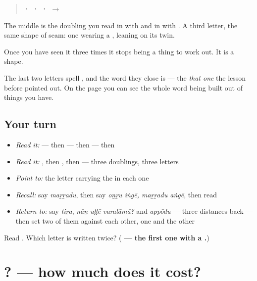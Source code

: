 \begin{quote}
\textbf{ ·  ·  ·  $\to$ }
\end{quote}

The middle is the doubling you read in \textbf{} with  and in \textbf{} with . A third letter, the same shape of seam: one wearing a \textbf{}, leaning on its twin.

Once you have seen it three times it stops being a thing to work out. It is a shape.

The last two letters spell \textbf{}, and the word they close is \textbf{} — the \emph{that one} the lesson before pointed out. On the page you can see the whole word being built out of things you have.

\subsection*{Your turn}
\begin{itemize}
\raggedright
  \item \emph{Read it:} \textbf{} — then \textbf{} — then \textbf{} — then \textbf{}
  \item \emph{Read it:} \textbf{}, then \textbf{}, then \textbf{} — three doublings, three letters
  \item \emph{Point to:} the letter carrying the \textbf{} in each one
  \item \emph{Recall:} say \emph{maṟṟadu}, then say \emph{oṉṟu iṅgē, maṟṟadu aṅgē}, then read \textbf{}
  \item \emph{Return to:} say \emph{tiṟa}, \emph{nāṉ uḷḷē varalāmā?} and \emph{appōdu} — three distances back — then set two of them against each other, one and the other
\end{itemize}

\begin{tcolorbox}[breakable,colback=teal!4,colframe=teal!35!black,title={Before you move on}]
Read \textbf{}. Which letter is written twice? (\textbf{ — the first one with a .})
\end{tcolorbox}
\section[\texorpdfstring{\ta{விலை} \ta{எவ்வளவு}? (vilai evvaḷavu?)}{விலை எவ்வளவு? (vilai evvaḷavu?)}]{ ? — how much does it cost?}

